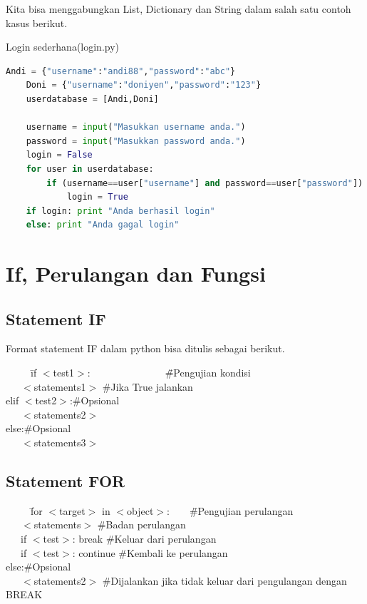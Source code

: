 Kita bisa menggabungkan List, Dictionary dan String dalam salah satu contoh kasus berikut.
\begin{listprog}{Login sederhana(login.py)}
	\label{lst:inputPython}
	\begin{lstlisting}[language=Python]
	Andi = {"username":"andi88","password":"abc"}
	Doni = {"username":"doniyen","password":"123"}
	userdatabase = [Andi,Doni]

	username = input("Masukkan username anda.")
	password = input("Masukkan password anda.")
	login = False
	for user in userdatabase:
	    if (username==user["username"] and password==user["password"]):
	        login = True
	if login: print "Anda berhasil login"
	else: print "Anda gagal login"

	\end{lstlisting}
\end{listprog}

\section{If, Perulangan dan Fungsi}

\subsection{Statement IF}
Format statement IF dalam python bisa ditulis sebagai berikut.

\begin{tabbing}
~~~~~\=if $<$test1$>$:~~~~~~~~~~~~~~~\=\#Pengujian kondisi\\
\>~~~$<$statements1$>$ \> \#Jika True jalankan\\
\>elif $<$test2$>$:\>\#Opsional\\
\>~~~$<$statements2$>$\>\\
\>else:\>\#Opsional\\
\>~~~$<$statements3$>$\>\\
\end{tabbing}

\subsection{Statement FOR}

\begin{tabbing}
~~~~~\=for $<$target$>$ in $<$object$>$:~~~~\=\#Pengujian perulangan\\
\>~~~$<$statements$>$ \> \#Badan perulangan\\
\>~~~if $<$test$>$: break \> \#Keluar dari perulangan\\
\>~~~if $<$test$>$: continue \> \#Kembali ke perulangan\\
\>else:\>\#Opsional\\
\>~~~$<$statements2$>$\> \#Dijalankan jika tidak keluar dari pengulangan dengan BREAK\\
\end{tabbing}

